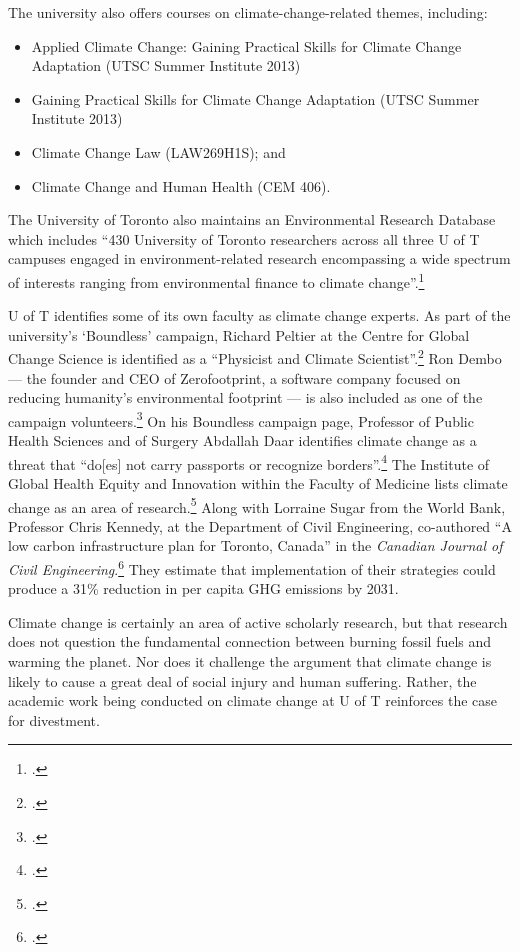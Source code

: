 The university also offers courses on climate-change-related themes, including:
\begin{itemize}
	\item Applied Climate Change: Gaining Practical Skills for Climate Change Adaptation (UTSC Summer Institute 2013)
	\item Gaining Practical Skills for Climate Change Adaptation (UTSC Summer Institute 2013)
	\item Climate Change Law (LAW269H1S); and
	\item Climate Change and Human Health (CEM 406).
\end{itemize}
The University of Toronto also maintains an Environmental Research Database which includes ``430 University of Toronto researchers across all three U of T campuses engaged in environment-related research encompassing a wide spectrum of interests ranging from environmental finance to climate change''.\footcite[][]{UTEnvResDB}






U of T identifies some of its own faculty as climate change experts.
As part of the university's `Boundless' campaign, Richard Peltier at the Centre for Global Change Science is identified as a ``Physicist and Climate Scientist''.\footcite[][]{PeltierBoundless}
Ron Dembo --- the founder and CEO of Zerofootprint, a software company focused on reducing humanity's environmental footprint --- is also included as one of the campaign volunteers.\footcite[][]{DemboBoundless}
On his Boundless campaign page, Professor of Public Health Sciences and of Surgery Abdallah Daar identifies climate change as a threat that ``do[es] not carry passports or recognize borders''.\footcite[][]{DaarBoundless}
The Institute of Global Health Equity and Innovation within the Faculty of Medicine lists climate change as an area of research.\footcite[][]{GlobalHealthEquity}
Along with Lorraine Sugar from the World Bank, Professor Chris Kennedy, at the Department of Civil Engineering, co-authored ``A low carbon infrastructure plan for Toronto, Canada'' in the \emph{Canadian Journal of Civil Engineering}.\footcite[][p. 86-96]{Sugar2012}
They estimate that implementation of their strategies could produce a 31\% reduction in per capita GHG emissions by 2031.



Climate change is certainly an area of active scholarly research, but that research does not question the fundamental connection between burning fossil fuels and warming the planet. 
Nor does it challenge the argument that climate change is likely to cause a great deal of social injury and human suffering.
Rather, the academic work being conducted on climate change at U of T reinforces the case for divestment.



